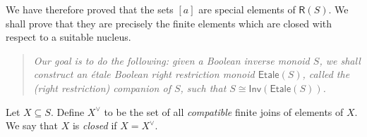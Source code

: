 \documentclass[a4paper]{amsart}
\begin{document}
We have therefore proved that the sets $[a]$ are special elements of $\mathsf{R}(S)$.
We shall prove that they are precisely the finite elements which are closed with respect to a suitable nucleus.

\begin{quote}
{\em Our goal is to do the following: given a Boolean inverse monoid $S$,
we shall construct an \'etale Boolean right restriction monoid $\mathsf{Etale}(S)$,
called the {\em (right restriction) companion} of $S$, such that $S \cong \mathsf{Inv}(\mathsf{Etale}(S))$.}
\end{quote}

Let $X \subseteq S$. 
Define $X^{\vee}$ to be the set of all {\em compatible}
finite joins of elements of $X$.
We say that $X$ is {\em closed} if $X = X^{\vee}$.
\end{document}
